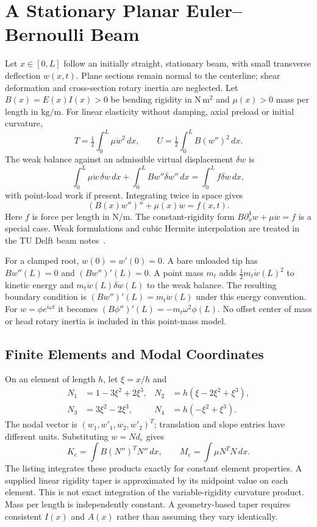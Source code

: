 \section{A Stationary Planar Euler--Bernoulli Beam}
Let $x\in[0,L]$ follow an initially straight, stationary beam, with small transverse
deflection $w(x,t)$. Plane sections remain normal to the centerline; shear deformation
and cross-section rotary inertia are neglected. Let $B(x)=E(x)I(x)>0$ be bending
rigidity in $\mathrm{N\,m^2}$ and $\mu(x)>0$ mass per length in $\mathrm{kg/m}$.
For linear elasticity without damping, axial preload or initial curvature,
\begin{equation}
 T=\tfrac12\int_0^L\mu\dot w^2\,dx,\qquad
 U=\tfrac12\int_0^LB(w'')^2\,dx.
\end{equation}
The weak balance against an admissible virtual displacement $\delta w$ is
\begin{equation}
 \int_0^L\mu\ddot w\,\delta w\,dx+
 \int_0^LBw''\delta w''\,dx=\int_0^Lf\delta w\,dx,
\end{equation}
with point-load work if present. Integrating twice in space gives
\begin{equation}
 (B(x)w'')''+\mu(x)\ddot w=f(x,t).
 \label{eq:ch9:euler-bernoulli}
\end{equation}
Here $f$ is force per length in $\mathrm{N/m}$. The constant-rigidity form
$B\partial_x^4w+\mu\ddot w=f$ is a special case. Weak formulations and cubic Hermite
interpolation are treated in the TU Delft beam notes~\cite{DelftBeamReview}.

For a clamped root, $w(0)=w'(0)=0$. A bare unloaded tip has $Bw''(L)=0$ and
$(Bw'')'(L)=0$. A point mass $m_t$ adds $\tfrac12m_t\dot w(L)^2$ to kinetic energy
and $m_t\ddot w(L)\delta w(L)$ to the weak balance. The resulting boundary condition
is $(Bw'')'(L)=m_t\ddot w(L)$ under this energy convention. For
$w=\phi e^{i\omega t}$ it becomes $(B\phi'')'(L)=-m_t\omega^2\phi(L)$.
No offset center of mass or head rotary inertia is included in this point-mass model.

\subsection{Finite Elements and Modal Coordinates}
On an element of length $h$, let $\xi=x/h$ and
\begin{align}
 N_1&=1-3\xi^2+2\xi^3,&N_2&=h(\xi-2\xi^2+\xi^3),\\
 N_3&=3\xi^2-2\xi^3,&N_4&=h(-\xi^2+\xi^3).
\end{align}
The nodal vector is $(w_1,w'_1,w_2,w'_2)^T$; translation and slope entries have
different units. Substituting $w=N d_e$ gives
\begin{equation}
 K_e=\int B(N'')^TN''\,dx,\qquad M_e=\int\mu N^TN\,dx.
\end{equation}
The listing integrates these products exactly for constant element properties.
A supplied linear rigidity taper is approximated by its midpoint value on each
element. This is not exact integration of the variable-rigidity curvature product.
Mass per length is independently constant. A geometry-based taper requires
consistent $I(x)$ and $A(x)$ rather than assuming they vary identically.

